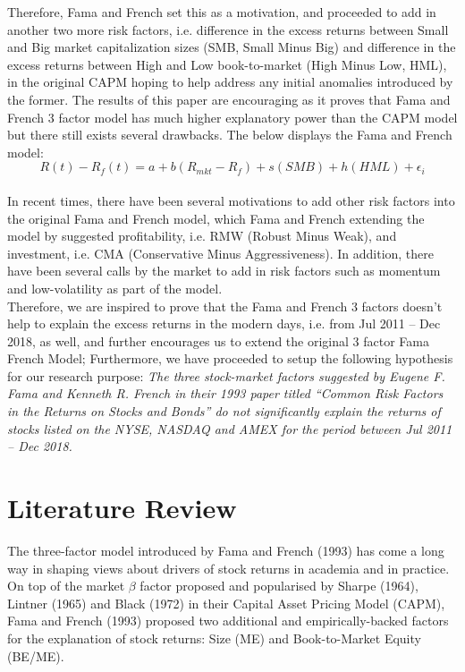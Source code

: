 \documentclass[12pt]{article}
\begin{document}
	\noindent Therefore, Fama and French set this as a motivation, and proceeded to add in another two more risk factors, i.e. difference in the excess returns between Small and Big market capitalization sizes (SMB, Small Minus Big) and difference in the excess returns between High and Low book-to-market (High Minus Low, HML), in the original CAPM hoping to help address any initial anomalies introduced by the former. The results of this paper are encouraging as it proves that Fama and French 3 factor model has much higher explanatory power than the CAPM model but there still exists several drawbacks. The below displays the Fama and French model: \\
	
	\noindent $$
	R(t) - R_f(t) = a+ b(R_{mkt} - R_f) + s(SMB) + h(HML) +\epsilon_i
	$$ \\
	
	
	\noindent In recent times, there have been several motivations to add other risk factors into the original Fama and French model, which Fama and French extending the model by suggested profitability, i.e. RMW (Robust Minus Weak), and investment, i.e. CMA (Conservative Minus Aggressiveness). In addition, there have been several calls by the market to add in risk factors such as momentum and low-volatility as part of the model. \\
	
	\noindent Therefore, we are inspired to prove that the Fama and French 3 factors doesn’t help to explain the excess returns in the modern days, i.e. from Jul 2011 – Dec 2018, as well, and further encourages us to extend the original 3 factor Fama French Model; Furthermore, we have proceeded to setup the following hypothesis for our research purpose: {\textit{The three stock-market factors suggested by Eugene F. Fama and Kenneth R. French in their 1993 paper titled “Common Risk Factors in the Returns on Stocks and Bonds” do not significantly explain the returns of stocks listed on the NYSE, NASDAQ and AMEX for the period between Jul 2011 – Dec 2018.}}
	
	
	\section{Literature Review} %
	
	The three-factor model introduced by Fama and French (1993) has come a long way in shaping views about drivers of stock returns in academia and in practice. On top of the market $\beta$ factor proposed and popularised by Sharpe (1964), Lintner (1965) and Black (1972) in their Capital Asset Pricing Model (CAPM), Fama and French (1993) proposed two additional and empirically-backed factors for the explanation of stock returns: Size (ME) and Book-to-Market Equity (BE/ME). \\
	
\end{document}
